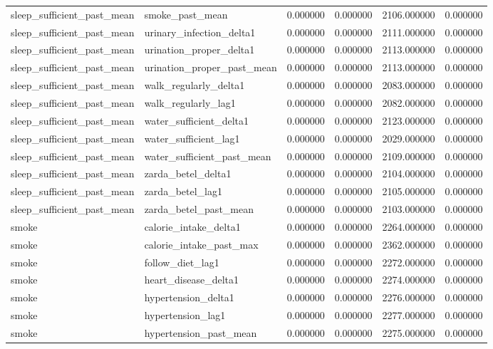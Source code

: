 \begin{longtable}{llrrrr}
sleep\_sufficient\_past\_mean & smoke\_past\_mean & 0.000000 & 0.000000 & 2106.000000 & 0.000000 \\
sleep\_sufficient\_past\_mean & urinary\_infection\_delta1 & 0.000000 & 0.000000 & 2111.000000 & 0.000000 \\
sleep\_sufficient\_past\_mean & urination\_proper\_delta1 & 0.000000 & 0.000000 & 2113.000000 & 0.000000 \\
sleep\_sufficient\_past\_mean & urination\_proper\_past\_mean & 0.000000 & 0.000000 & 2113.000000 & 0.000000 \\
sleep\_sufficient\_past\_mean & walk\_regularly\_delta1 & 0.000000 & 0.000000 & 2083.000000 & 0.000000 \\
sleep\_sufficient\_past\_mean & walk\_regularly\_lag1 & 0.000000 & 0.000000 & 2082.000000 & 0.000000 \\
sleep\_sufficient\_past\_mean & water\_sufficient\_delta1 & 0.000000 & 0.000000 & 2123.000000 & 0.000000 \\
sleep\_sufficient\_past\_mean & water\_sufficient\_lag1 & 0.000000 & 0.000000 & 2029.000000 & 0.000000 \\
sleep\_sufficient\_past\_mean & water\_sufficient\_past\_mean & 0.000000 & 0.000000 & 2109.000000 & 0.000000 \\
sleep\_sufficient\_past\_mean & zarda\_betel\_delta1 & 0.000000 & 0.000000 & 2104.000000 & 0.000000 \\
sleep\_sufficient\_past\_mean & zarda\_betel\_lag1 & 0.000000 & 0.000000 & 2105.000000 & 0.000000 \\
sleep\_sufficient\_past\_mean & zarda\_betel\_past\_mean & 0.000000 & 0.000000 & 2103.000000 & 0.000000 \\
smoke & calorie\_intake\_delta1 & 0.000000 & 0.000000 & 2264.000000 & 0.000000 \\
smoke & calorie\_intake\_past\_max & 0.000000 & 0.000000 & 2362.000000 & 0.000000 \\
smoke & follow\_diet\_lag1 & 0.000000 & 0.000000 & 2272.000000 & 0.000000 \\
smoke & heart\_disease\_delta1 & 0.000000 & 0.000000 & 2274.000000 & 0.000000 \\
smoke & hypertension\_delta1 & 0.000000 & 0.000000 & 2276.000000 & 0.000000 \\
smoke & hypertension\_lag1 & 0.000000 & 0.000000 & 2277.000000 & 0.000000 \\
smoke & hypertension\_past\_mean & 0.000000 & 0.000000 & 2275.000000 & 0.000000 \\

\end{longtable}

